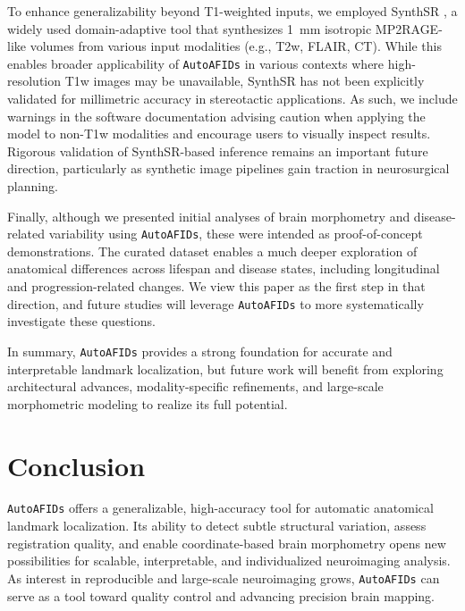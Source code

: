 To enhance generalizability beyond T1-weighted inputs, we employed SynthSR \cite{Iglesias2023-co}, a widely used domain-adaptive tool that synthesizes 1~mm isotropic MP2RAGE-like volumes from various input modalities (e.g., T2w, FLAIR, CT). While this enables broader applicability of \texttt{AutoAFIDs} in various contexts where high-resolution T1w images may be unavailable, SynthSR has not been explicitly validated for millimetric accuracy in stereotactic applications. As such, we include warnings in the software documentation advising caution when applying the model to non-T1w modalities and encourage users to visually inspect results. Rigorous validation of SynthSR-based inference remains an important future direction, particularly as synthetic image pipelines gain traction in neurosurgical planning.

Finally, although we presented initial analyses of brain morphometry and disease-related variability using \texttt{AutoAFIDs}, these were intended as proof-of-concept demonstrations. The curated dataset enables a much deeper exploration of anatomical differences across lifespan and disease states, including longitudinal and progression-related changes. We view this paper as the first step in that direction, and future studies will leverage \texttt{AutoAFIDs} to more systematically investigate these questions.

In summary, \texttt{AutoAFIDs} provides a strong foundation for accurate and interpretable landmark localization, but future work will benefit from exploring architectural advances, modality-specific refinements, and large-scale morphometric modeling to realize its full potential.

\section{Conclusion}

\texttt{AutoAFIDs} offers a generalizable, high-accuracy tool for automatic anatomical landmark localization. Its ability to detect subtle structural variation, assess registration quality, and enable coordinate-based brain morphometry opens new possibilities for scalable, interpretable, and individualized neuroimaging analysis. As interest in reproducible and large-scale neuroimaging grows, \texttt{AutoAFIDs} can serve as a tool toward quality control and advancing precision brain mapping.



